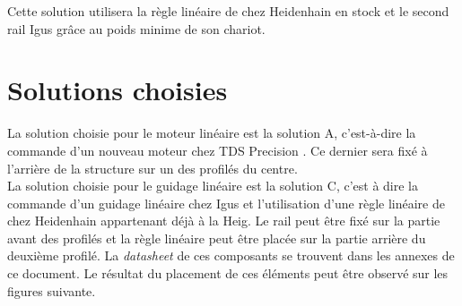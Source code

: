 \begin{table}[H]
  \centering
  \caption{Offres pour le guidage}
  \label{tab:OffreGuid2}
\end{table}

Cette solution utilisera la règle linéaire de chez Heidenhain \cite{Heidenhain} en stock et le second rail Igus \cite{Igus} grâce au poids minime de son chariot.

\section{Solutions choisies}\label{sec:SolChoix}

La solution choisie pour le moteur linéaire est la solution A, c'est-à-dire la commande d'un nouveau moteur chez TDS Precision \cite{TDSPrecisionProducts}. Ce dernier
sera fixé à l'arrière de la structure sur un des profilés du centre.\\

La solution choisie pour le guidage linéaire est la solution C, c'est à dire la commande d'un guidage linéaire chez Igus \cite{Igus} et l'utilisation d'une
règle linéaire de chez Heidenhain \cite{Heidenhain} appartenant déjà à la \acrshort{Heig}. Le rail peut être fixé sur la partie avant des profilés et la règle linéaire peut
être placée sur la partie arrière du deuxième profilé. La \textit{datasheet} de ces composants se trouvent dans les annexes de ce document. Le résultat du placement de ces
éléments peut être observé sur les figures suivante.


